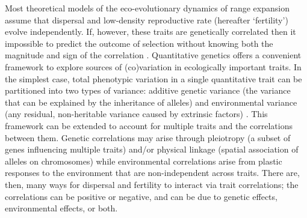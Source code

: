\documentclass[11pt]{article}
\begin{document}
Most theoretical models of the eco-evolutionary dynamics of range expansion assume that dispersal and low-density reproductive rate (hereafter `fertility') evolve independently.
If, however, these traits are genetically correlated then it impossible to predict the outcome of selection without knowing both the magnitude and sign of the correlation \citep{lande_measurement_1983,chenoweth2010contribution}.
Quantitative genetics offers a convenient framework to explore sources of (co)variation in ecologically important traits.
In the simplest case, total phenotypic variation in a single quantitative trait can be partitioned into two types of variance: additive genetic variance (the variance that can be explained by the inheritance of alleles) and environmental variance (any residual, non-heritable variance caused by extrinsic factors) \citep{lynch_genetics_1998,kruuk_estimating_2004,wilson_ecologists_2010}.
This framework can be extended to account for multiple traits and the correlations between them.
Genetic correlations may arise through pleiotropy (a subset of genes influencing multiple traits) and/or physical linkage (spatial association of alleles on chromosomes) \citep{roff_evolutionary_1997} while environmental correlations arise from plastic responses to the environment that are non-independent across traits.
There are, then, many ways for dispersal and fertility to interact via trait correlations; the correlations can be positive or negative, and can be due to genetic effects, environmental effects, or both.
\end{document}
